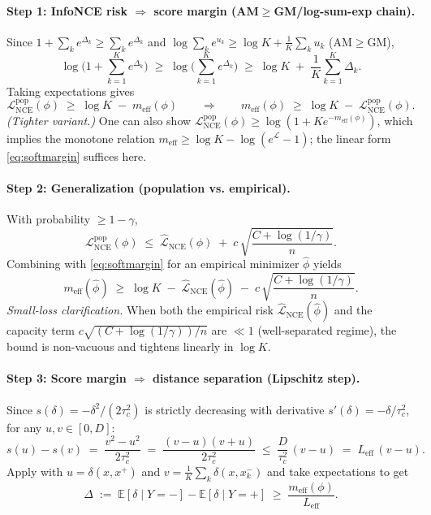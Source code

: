 \documentclass[11pt]{article}
\begin{document}
\paragraph{Step 1: InfoNCE risk $\Rightarrow$ score margin (AM$\ge$GM/log-sum-exp chain).}
Since $1+\sum_k e^{\Delta_k} \ge \sum_k e^{\Delta_k}$ and
$\log\sum_{k} e^{u_k} \ge \log K + \tfrac{1}{K}\sum_k u_k$ (AM$\ge$GM),
\[
\log\!\Big(1+\sum_{k=1}^{K} e^{\Delta_k}\Big)
\;\ge\;
\log\!\Big(\sum_{k=1}^{K} e^{\Delta_k}\Big)
\;\ge\;
\log K \;+\; \frac{1}{K}\sum_{k=1}^{K}\Delta_k.
\]
Taking expectations gives
\begin{equation}
\label{eq:softmargin}
\mathcal{L}_{\mathrm{NCE}}^{\mathrm{pop}}(\phi) \;\ge\; \log K \;-\; m_{\mathrm{eff}}(\phi)
\qquad\Rightarrow\qquad
m_{\mathrm{eff}}(\phi) \;\ge\; \log K \;-\; \mathcal{L}_{\mathrm{NCE}}^{\mathrm{pop}}(\phi).
\end{equation}
\emph{(Tighter variant.)} One can also show $\mathcal{L}_{\mathrm{NCE}}^{\mathrm{pop}}(\phi)\ge \log(1+K e^{-m_{\mathrm{eff}}(\phi)})$, which implies the monotone relation $m_{\mathrm{eff}}\ge \log K - \log(e^{\mathcal{L}}-1)$; the linear form \eqref{eq:softmargin} suffices here.

\paragraph{Step 2: Generalization (population vs. empirical).}
With probability $\ge 1-\gamma$,
\[
\mathcal{L}_{\mathrm{NCE}}^{\mathrm{pop}}(\phi)
\;\le\;
\widehat{\mathcal{L}}_{\mathrm{NCE}}(\phi)
\;+\;
c\,\sqrt{\frac{C+\log(1/\gamma)}{n}}.
\]
Combining with \eqref{eq:softmargin} for an empirical minimizer $\hat\phi$ yields
\begin{equation}
\label{eq:meff-lower}
m_{\mathrm{eff}}(\hat\phi)
\;\ge\;
\log K \;-\; \widehat{\mathcal{L}}_{\mathrm{NCE}}(\hat\phi)
\;-\; c\,\sqrt{\frac{C+\log(1/\gamma)}{n}}.
\end{equation}
\emph{Small-loss clarification.} When both the empirical risk $\widehat{\mathcal{L}}_{\mathrm{NCE}}(\hat\phi)$ and the capacity term $c\sqrt{(C+\log(1/\gamma))/n}$ are $\ll 1$ (well-separated regime), the bound is non-vacuous and tightens linearly in $\log K$.

\paragraph{Step 3: Score margin $\Rightarrow$ distance separation (Lipschitz step).}
Since $s(\delta)=-\delta^2/(2\tau_c^2)$ is strictly decreasing with derivative $s'(\delta)=-\delta/\tau_c^2$, for any $u,v\in[0,D]$:
\[
s(u)-s(v) \;=\; \frac{v^2-u^2}{2\tau_c^2}
\;=\; \frac{(v-u)(v+u)}{2\tau_c^2}
\;\le\; \frac{D}{\tau_c^2}\,(v-u)
\;=\; L_{\mathrm{eff}}\,(v-u).
\]
Apply with $u=\delta(x,x^+)$ and $v=\tfrac{1}{K}\sum_k \delta(x,x_k^-)$ and take expectations to get
\begin{equation}
\label{eq:pop-gap}
\Delta\;:=\;\mathbb{E}[\delta\mid Y=-]-\mathbb{E}[\delta\mid Y=+]
\;\ge\;
\frac{m_{\mathrm{eff}}(\phi)}{L_{\mathrm{eff}}}.
\end{equation}
\end{document}
